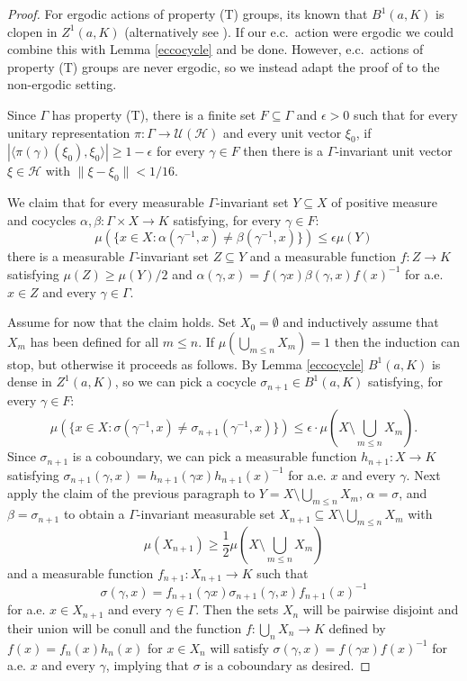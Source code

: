\documentclass[12pt]{amsart}
\theoremstyle{definition}
\begin{document}
\begin{proof}
    For ergodic actions of property (T) groups, its known that $B^1(a,K)$ is clopen in $Z^1(a,K)$ \cite[Lemma 4.2]{Po07} (alternatively see \cite[Theorem 4.2]{Fu07}). If our e.c.\ action were ergodic we could combine this with Lemma \ref{eccocycle} and be done. However, e.c.\ actions of property (T) groups are never ergodic, so we instead adapt the proof of \cite[Theorem 4.2]{Fu07} to the non-ergodic setting.
    
	Since $\Gamma$ has property (T), there is a finite set $F \subseteq \Gamma$ and $\epsilon > 0$ such that for every unitary representation $\pi : \Gamma \rightarrow \mathcal{U}(\mathcal{H})$ and every unit vector $\xi_0$, if $|\langle \pi(\gamma)(\xi_0), \xi_0 \rangle| \geq 1 - \epsilon$ for every $\gamma \in F$ then there is a $\Gamma$-invariant unit vector $\xi \in \mathcal{H}$ with $\|\xi - \xi_0\| < 1/16$.
	
	We claim that for every measurable $\Gamma$-invariant set $Y \subseteq X$ of positive measure and cocycles $\alpha, \beta : \Gamma \times X \rightarrow K$ satisfying, for every $\gamma\in F$:
	$$\mu(\{x \in X : \alpha(\gamma^{-1},x) \neq \beta(\gamma^{-1}, x)\}) \leq \epsilon \mu(Y)$$
	there is a measurable $\Gamma$-invariant set $Z \subseteq Y$ and a measurable function $f : Z \rightarrow K$ satisfying $\mu(Z) \geq \mu(Y) / 2$ and $\alpha(\gamma, x) = f(\gamma x) \beta(\gamma, x) f(x)^{-1}$ for a.e. $x \in Z$ and every $\gamma \in \Gamma$.
	
	Assume for now that the claim holds. Set $X_0 = \emptyset$ and inductively assume that $X_m$ has been defined for all $m \leq n$. If $\mu(\bigcup_{m \leq n} X_m) = 1$ then the induction can stop, but otherwise it proceeds as follows. By Lemma \ref{eccocycle} $B^1(a,K)$ is dense in $Z^1(a,K)$, so we can pick a cocycle $\sigma_{n+1} \in B^1(a,K)$ satisfying, for every $\gamma\in F$:
	$$\mu(\{x \in X : \sigma(\gamma^{-1},x) \neq \sigma_{n+1}(\gamma^{-1}, x)\}) \leq \epsilon \cdot \mu \left(X \setminus \bigcup_{m \leq n} X_m \right).$$
	Since $\sigma_{n+1}$ is a coboundary, we can pick a measurable function $h_{n+1} : X \rightarrow K$ satisfying $\sigma_{n+1}(\gamma, x) = h_{n+1}(\gamma x) h_{n+1}(x)^{-1}$ for a.e. $x$ and every $\gamma$. Next apply the claim of the previous paragraph to $Y = X \setminus \bigcup_{m \leq n} X_m$, $\alpha = \sigma$, and $\beta = \sigma_{n+1}$ to obtain a $\Gamma$-invariant measurable set $X_{n+1} \subseteq X \setminus \bigcup_{m \leq n} X_m$ with
	$$\mu(X_{n+1}) \geq \frac{1}{2} \mu \left( X \setminus \bigcup_{m \leq n} X_m \right)$$
	and a measurable function $f_{n+1} : X_{n+1} \rightarrow K$ such that
	$$\sigma(\gamma, x) = f_{n+1}(\gamma x) \sigma_{n+1}(\gamma, x) f_{n+1}(x)^{-1}$$
	for a.e. $x \in X_{n+1}$ and every $\gamma \in \Gamma$. Then the sets $X_n$ will be pairwise disjoint and their union will be conull and the function $f : \bigcup_n X_n \rightarrow K$ defined by $f(x) = f_n(x) h_n(x)$ for $x \in X_n$ will satisfy $\sigma(\gamma, x) = f(\gamma x) f(x)^{-1}$ for a.e. $x$ and every $\gamma$, implying that $\sigma$ is a coboundary as desired.
	

\end{proof}
\end{document}
